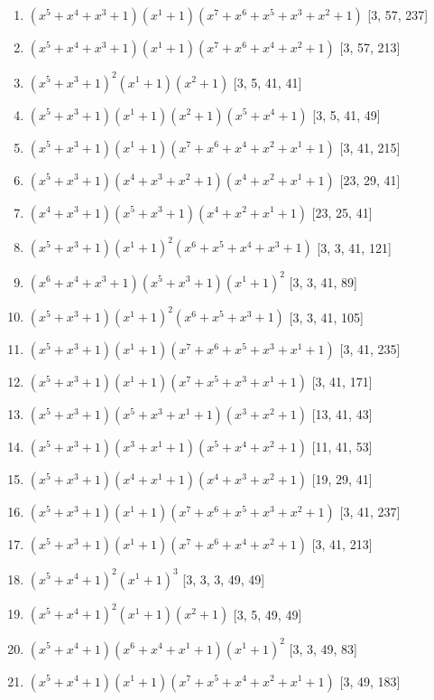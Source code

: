 \documentclass[10pt,twocolumn]{article}
\begin{document}
\begin{enumerate}
\item $(x^{5} + x^{4} + x^{3} + 1)(x^{1} + 1)(x^{7} + x^{6} + x^{5} + x^{3} + x^{2} + 1)$  [3, 57, 237]
\item $(x^{5} + x^{4} + x^{3} + 1)(x^{1} + 1)(x^{7} + x^{6} + x^{4} + x^{2} + 1)$  [3, 57, 213]
\item $(x^{5} + x^{3} + 1)^{2}(x^{1} + 1)(x^{2} + 1)$  [3, 5, 41, 41]
\item $(x^{5} + x^{3} + 1)(x^{1} + 1)(x^{2} + 1)(x^{5} + x^{4} + 1)$  [3, 5, 41, 49]
\item $(x^{5} + x^{3} + 1)(x^{1} + 1)(x^{7} + x^{6} + x^{4} + x^{2} + x^{1} + 1)$  [3, 41, 215]
\item $(x^{5} + x^{3} + 1)(x^{4} + x^{3} + x^{2} + 1)(x^{4} + x^{2} + x^{1} + 1)$  [23, 29, 41]
\item $(x^{4} + x^{3} + 1)(x^{5} + x^{3} + 1)(x^{4} + x^{2} + x^{1} + 1)$  [23, 25, 41]
\item $(x^{5} + x^{3} + 1)(x^{1} + 1)^{2}(x^{6} + x^{5} + x^{4} + x^{3} + 1)$  [3, 3, 41, 121]
\item $(x^{6} + x^{4} + x^{3} + 1)(x^{5} + x^{3} + 1)(x^{1} + 1)^{2}$  [3, 3, 41, 89]
\item $(x^{5} + x^{3} + 1)(x^{1} + 1)^{2}(x^{6} + x^{5} + x^{3} + 1)$  [3, 3, 41, 105]
\item $(x^{5} + x^{3} + 1)(x^{1} + 1)(x^{7} + x^{6} + x^{5} + x^{3} + x^{1} + 1)$  [3, 41, 235]
\item $(x^{5} + x^{3} + 1)(x^{1} + 1)(x^{7} + x^{5} + x^{3} + x^{1} + 1)$  [3, 41, 171]
\item $(x^{5} + x^{3} + 1)(x^{5} + x^{3} + x^{1} + 1)(x^{3} + x^{2} + 1)$  [13, 41, 43]
\item $(x^{5} + x^{3} + 1)(x^{3} + x^{1} + 1)(x^{5} + x^{4} + x^{2} + 1)$  [11, 41, 53]
\item $(x^{5} + x^{3} + 1)(x^{4} + x^{1} + 1)(x^{4} + x^{3} + x^{2} + 1)$  [19, 29, 41]
\item $(x^{5} + x^{3} + 1)(x^{1} + 1)(x^{7} + x^{6} + x^{5} + x^{3} + x^{2} + 1)$  [3, 41, 237]
\item $(x^{5} + x^{3} + 1)(x^{1} + 1)(x^{7} + x^{6} + x^{4} + x^{2} + 1)$  [3, 41, 213]
\item $(x^{5} + x^{4} + 1)^{2}(x^{1} + 1)^{3}$  [3, 3, 3, 49, 49]
\item $(x^{5} + x^{4} + 1)^{2}(x^{1} + 1)(x^{2} + 1)$  [3, 5, 49, 49]
\item $(x^{5} + x^{4} + 1)(x^{6} + x^{4} + x^{1} + 1)(x^{1} + 1)^{2}$  [3, 3, 49, 83]
\item $(x^{5} + x^{4} + 1)(x^{1} + 1)(x^{7} + x^{5} + x^{4} + x^{2} + x^{1} + 1)$  [3, 49, 183]

\end{enumerate}
\end{document}
